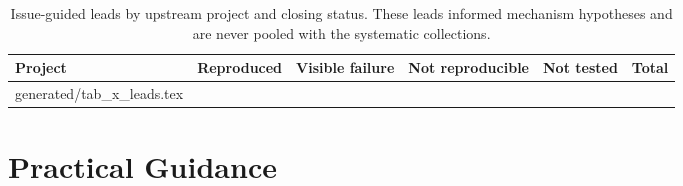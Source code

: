 \documentclass[11pt,a4paper]{article}
\makeatletter
\newcommand{\tablebody}[1]{\@@input generated/#1.tex }
\makeatother
\begin{document}
\begin{table}[htbp]
  \centering\small
  \caption{Issue-guided leads by upstream project and closing status. These
    leads informed mechanism hypotheses and are never pooled with the
    systematic collections.}
  \label{tab:leads}
  \begin{tabular}{@{}lrrrrr@{}}
    \toprule
    Project & Reproduced & Visible failure & Not reproducible & Not tested & Total \\
    \midrule
    \tablebody{tab_x_leads}
    \bottomrule
  \end{tabular}
\end{table}

\section{Practical Guidance}
\label{sec:guidance}
\end{document}
